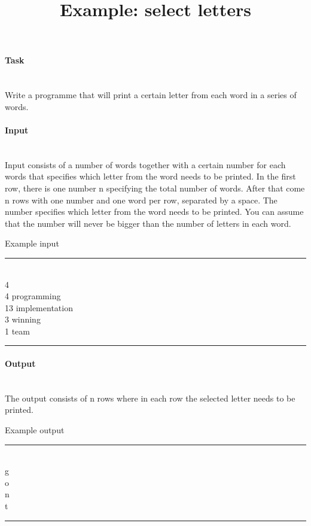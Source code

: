 \documentclass[10pt,a4paper]{article}
\begin{document}
\title{Example: select letters}
\maketitle



\paragraph{Task\\ \\}

Write a programme that will print a certain letter from each word in a series of words.

\paragraph{Input\\ \\}

Input consists of a number of words together with a certain number for each words that specifies which letter from the word needs to be printed. In the first row, there is one number n specifying the total number of words. After that come n rows with one number and one word per row, separated by a space. The number specifies which letter from the word needs to be printed. You can assume that the number will never be bigger than the number of letters in each word.


\begin{center}
Example input
\hrule
\end{center}
\mbox{}\\
4\\
4 programming\\
13 implementation\\
3 winning\\
1 team\\
\hrule

	
\paragraph{Output\\ \\}

The output consists of n rows where in each row the selected letter needs to be printed.

\begin{center}
Example output
\hrule
\end{center}
\mbox{} \\
g\\
o\\
n\\
t\\
\hrule
\end{document}
